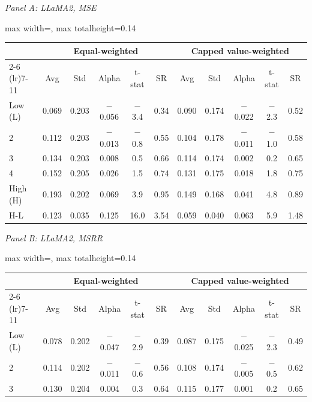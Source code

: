 \begin{table}[htbp]
{\footnotesize
\textit{Panel A: LLaMA2, MSE}\\[2pt]
\begin{adjustbox}{max width=\linewidth, max totalheight=0.14\textheight}
\begin{tabular}{lcccccccccc}
\toprule
 & \multicolumn{5}{c}{Equal-weighted} & \multicolumn{5}{c}{Capped value-weighted} \\
\cmidrule(lr){2-6} \cmidrule(lr){7-11}
 & Avg & Std & Alpha & t-stat & SR & Avg & Std & Alpha & t-stat & SR \\
\midrule
Low (L) & 0.069 & 0.203 & $-$0.056 & \phantom{0}$-$3.4 & 0.34 & 0.090 & 0.174 & $-$0.022 & $-$2.3 & 0.52 \\
2 & 0.112 & 0.203 & $-$0.013 & \phantom{0}$-$0.8 & 0.55 & 0.104 & 0.178 & $-$0.011 & $-$1.0 & 0.58 \\
3 & 0.134 & 0.203 & \phantom{$-$}0.008 & \phantom{$-$0}0.5 & 0.66 & 0.114 & 0.174 & \phantom{$-$}0.002 & \phantom{$-$}0.2 & 0.65 \\
4 & 0.152 & 0.205 & \phantom{$-$}0.026 & \phantom{$-$0}1.5 & 0.74 & 0.131 & 0.175 & \phantom{$-$}0.018 & \phantom{$-$}1.8 & 0.75 \\
High (H) & 0.193 & 0.202 & \phantom{$-$}0.069 & \phantom{$-$0}3.9 & 0.95 & 0.149 & 0.168 & \phantom{$-$}0.041 & \phantom{$-$}4.8 & 0.89 \\
H-L & 0.123 & 0.035 & \phantom{$-$}0.125 & \phantom{$-$}16.0 & 3.54 & 0.059 & 0.040 & \phantom{$-$}0.063 & \phantom{$-$}5.9 & 1.48 \\
\bottomrule
\end{tabular}
\end{adjustbox}
\par\medskip
\textit{Panel B: LLaMA2, MSRR}\\[2pt]
\begin{adjustbox}{max width=\linewidth, max totalheight=0.14\textheight}
\begin{tabular}{lcccccccccc}
\toprule
 & \multicolumn{5}{c}{Equal-weighted} & \multicolumn{5}{c}{Capped value-weighted} \\
\cmidrule(lr){2-6} \cmidrule(lr){7-11}
 & Avg & Std & Alpha & t-stat & SR & Avg & Std & Alpha & t-stat & SR \\
\midrule
Low (L) & 0.078 & 0.202 & $-$0.047 & \phantom{0}$-$2.9 & 0.39 & 0.087 & 0.175 & $-$0.025 & $-$2.3 & 0.49 \\
2 & 0.114 & 0.202 & $-$0.011 & \phantom{0}$-$0.6 & 0.56 & 0.108 & 0.174 & $-$0.005 & $-$0.5 & 0.62 \\
3 & 0.130 & 0.204 & \phantom{$-$}0.004 & \phantom{$-$0}0.3 & 0.64 & 0.115 & 0.177 & \phantom{$-$}0.001 & \phantom{$-$}0.2 & 0.65 \\

\end{tabular}
\end{adjustbox}}
\end{table}
